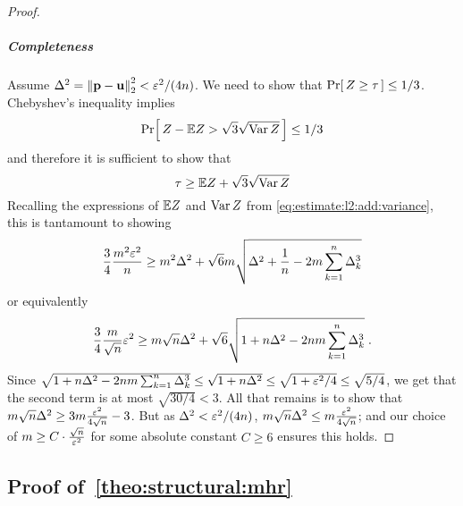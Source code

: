 \begin{proof}
\subparagraph{Completeness} Assume $\Delta^2={\lVert\mathbf{p}-\mathbf{u}{\rVert}}_2^2 < \varepsilon^2/(4n)$. We need to show that $\Pr\!\left[\,  Z \geq \tau \, \right] \leq 1/3$. Chebyshev's inequality implies
\[
    \Pr\!\left[\,  Z - \mathbb{E} Z > \sqrt{3}\sqrt{\operatorname{Var} Z} \, \right] \leq 1/3
\]
and therefore it is sufficient to show that 
\[
    \tau \geq \mathbb{E} Z + \sqrt{3}\sqrt{\operatorname{Var} Z}
\]
Recalling the expressions of $\mathbb{E} Z$ and $\operatorname{Var} Z$ from \eqref{eq:estimate:l2:add:variance}, this is tantamount to showing
\[
    \frac{3}{4}\frac{m^2\varepsilon^2}{n} \geq m^2\Delta^2 + \sqrt{6}m\sqrt{\Delta^2 + \frac{1}{n} -2m \sum_{k=1}^n \Delta_k^3}
\]
or equivalently
\[
    \frac{3}{4} \frac{m}{\sqrt{n}}\varepsilon^2 \geq m \sqrt{n} \Delta^2 + \sqrt{6} \sqrt{1 + n\Delta^2 -2nm \sum_{k=1}^n \Delta_k^3}\;.
\]
Since $\sqrt{1 + n\Delta^2 -2 n m  \sum_{k=1}^n \Delta_k^3} \leq \sqrt{1 + n\Delta^2} \leq \sqrt{1 + \varepsilon^2/4} \leq \sqrt{5/4}$, we get that the second term is at most $\sqrt{30/4} < 3$. All that remains is to show that $m\sqrt{n}\Delta^2 \geq 3m\frac{\varepsilon^2}{4\sqrt{n}}-3$. But as $\Delta^2 < \varepsilon^2/(4n)$, $m\sqrt{n}\Delta^2 \leq m\frac{\varepsilon^2}{4\sqrt{n}}$; and our choice of $m \geq C\cdot\frac{\sqrt{n}}{\varepsilon^2}$ for some absolute constant $C \geq 6$  ensures this holds.
\end{proof}
 
\subsection{Proof of~\cref{theo:structural:mhr}}\label{app:structural:proofs}


